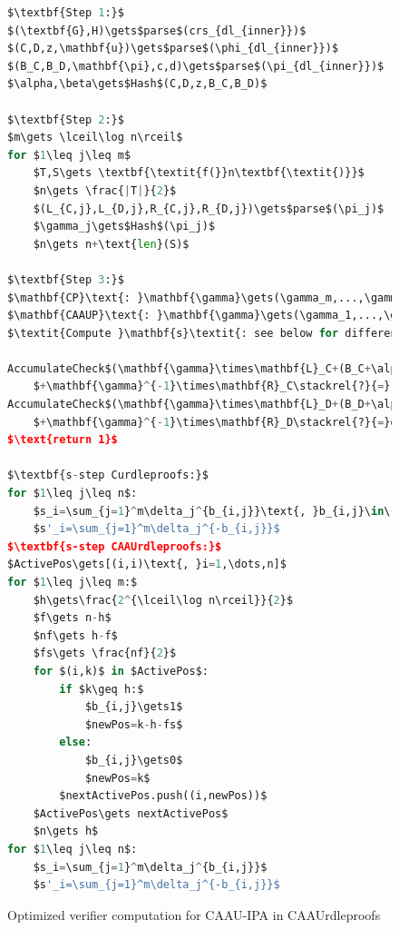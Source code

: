 \begin{figure}[ht]
    \begin{framed}
        \begin{lstlisting}[language=Python,mathescape=true,label={lst:ipa-verifier-optimized}]
$\textbf{Step 1:}$
$(\textbf{G},H)\gets$parse$(crs_{dl_{inner}})$
$(C,D,z,\mathbf{u})\gets$parse$(\phi_{dl_{inner}})$
$(B_C,B_D,\mathbf{\pi},c,d)\gets$parse$(\pi_{dl_{inner}})$
$\alpha,\beta\gets$Hash$(C,D,z,B_C,B_D)$

$\textbf{Step 2:}$
$m\gets \lceil\log n\rceil$
for $1\leq j\leq m$
    $T,S\gets \textbf{\textit{f(}}n\textbf{\textit{)}}$
    $n\gets \frac{|T|}{2}$
    $(L_{C,j},L_{D,j},R_{C,j},R_{D,j})\gets$parse$(\pi_j)$
    $\gamma_j\gets$Hash$(\pi_j)$
    $n\gets n+\text{len}(S)$

$\textbf{Step 3:}$
$\mathbf{CP}\text{: }\mathbf{\gamma}\gets(\gamma_m,...,\gamma_1)$
$\mathbf{CAAUP}\text{: }\mathbf{\gamma}\gets(\gamma_1,...,\gamma_m)$
$\textit{Compute }\mathbf{s}\textit{: see below for difference}$

AccumulateCheck$(\mathbf{\gamma}\times\mathbf{L}_C+(B_C+\alpha C+(\alpha^2z)H)$
    $+\mathbf{\gamma}^{-1}\times\mathbf{R}_C\stackrel{?}{=}(c\mathbf{s}\| cd\beta)\times(\mathbf{G}\| H))$
AccumulateCheck$(\mathbf{\gamma}\times\mathbf{L}_D+(B_D+\alpha D)$
    $+\mathbf{\gamma}^{-1}\times\mathbf{R}_D\stackrel{?}{=}d(\mathbf{s'}\circ\mathbf{u})\times\mathbf{G})$
$\text{return 1}$

$\textbf{s-step Curdleproofs:}$
for $1\leq j\leq n$:
    $s_i=\sum_{j=1}^m\delta_j^{b_{i,j}}\text{, }b_{i,j}\in\{0,1\}\text{ s.t. }i=\sum_{j=1}^mb_{i,j}2^j$
    $s'_i=\sum_{j=1}^m\delta_j^{-b_{i,j}}$
$\textbf{s-step CAAUrdleproofs:}$
$ActivePos\gets[(i,i)\text{, }i=1,\dots,n]$
for $1\leq j\leq m:$
    $h\gets\frac{2^{\lceil\log n\rceil}}{2}$
    $f\gets n-h$
    $nf\gets h-f$
    $fs\gets \frac{nf}{2}$
    for $(i,k)$ in $ActivePos$:
        if $k\geq h:$
            $b_{i,j}\gets1$
            $newPos=k-h-fs$
        else:
            $b_{i,j}\gets0$
            $newPos=k$
        $nextActivePos.push((i,newPos))$
    $ActivePos\gets nextActivePos$
    $n\gets h$
for $1\leq j\leq n$:
    $s_i=\sum_{j=1}^m\delta_j^{b_{i,j}}$
    $s'_i=\sum_{j=1}^m\delta_j^{-b_{i,j}}$
        \end{lstlisting}
    \end{framed}
    \caption{Optimized verifier computation for CAAU-IPA in CAAUrdleproofs}
    \label{fig:ipa-verifier-optimized}
\end{figure}


